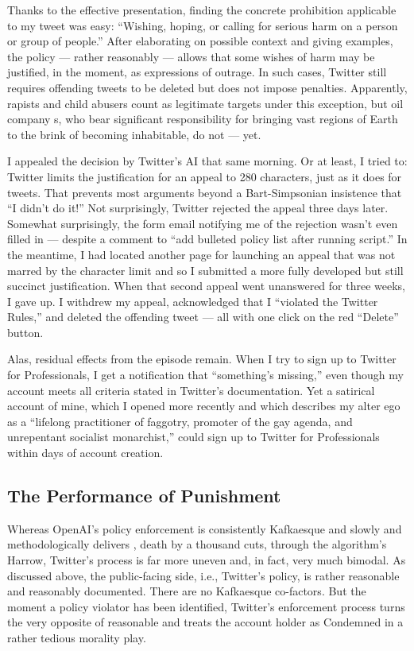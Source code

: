 Thanks to the effective presentation, finding the concrete prohibition
applicable to my tweet was easy: ``Wishing, hoping, or calling for serious harm
on a person or group of people.'' After elaborating on possible context and
giving examples, the policy --- rather reasonably --- allows that some wishes of
harm may be justified, in the moment, as expressions of outrage. In such cases,
Twitter still requires offending tweets to be deleted but does not impose
penalties. Apparently, rapists and child abusers count as legitimate targets
under this exception, but oil company \CEO{}s, who bear significant
responsibility for bringing vast regions of Earth to the brink of becoming
inhabitable, do not --- yet.

I appealed the decision by Twitter's AI that same morning. Or at least, I tried
to: Twitter limits the justification for an appeal to 280 characters, just as it
does for tweets. That prevents most arguments beyond a Bart-Simpsonian
insistence that ``I didn't do it!'' Not surprisingly, Twitter rejected the
appeal three days later. Somewhat surprisingly, the form email notifying me of
the rejection wasn't even filled in — despite a \HTML{} comment to ``add
bulleted policy list after running script.'' In the meantime, I had located
another page for launching an appeal that was not marred by the character limit
and so I submitted a more fully developed but still succinct justification. When
that second appeal went unanswered for three weeks, I gave up. I withdrew my
appeal, acknowledged that I ``violated the Twitter Rules,'' and deleted the
offending tweet --- all with one click on the red ``Delete'' button.

Alas, residual effects from the episode remain. When I try to sign up to Twitter
for Professionals, I get a notification that ``something's missing,'' even
though my account meets all criteria stated in Twitter's documentation. Yet a
satirical account of mine, which I opened more recently and which describes my
alter ego as a ``lifelong practitioner of faggotry, promoter of the gay agenda,
and unrepentant socialist monarchist,'' could sign up to Twitter for
Professionals within days of account creation.


\subsection{The Performance of Punishment}

Whereas OpenAI's policy enforcement is consistently Kafkaesque and slowly and
methodologically delivers
, death by a thousand
cuts, through the algorithm's Harrow, Twitter's process is far more uneven and,
in fact, very much bimodal. As discussed above, the public-facing side, i.e.,
Twitter's policy, is rather reasonable and reasonably documented. There are no
Kafkaesque co-factors. But the moment a policy violator has been identified,
Twitter's enforcement process turns the very opposite of reasonable and treats
the account holder as Condemned in a rather tedious morality play.

